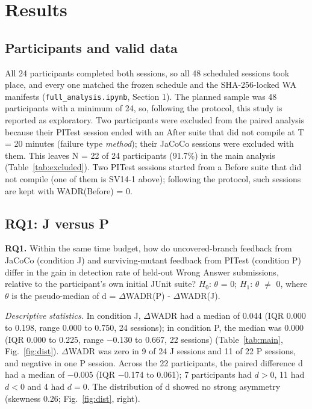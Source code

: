 \section{Results}
\label{sec:results}

\subsection{Participants and valid data}
All 24 participants completed both sessions, so all 48 scheduled sessions took place, and every one matched the frozen schedule and the SHA-256-locked WA manifests (\texttt{full\_analysis.ipynb}, Section 1).
The planned sample was 48 participants with a minimum of 24, so, following the protocol, this study is reported as exploratory.
Two participants were excluded from the paired analysis because their PITest session ended with an After suite that did not compile at T = 20 minutes (failure type \textit{method}); their JaCoCo sessions were excluded with them.
This leaves N = 22 of 24 participants (91.7\%) in the main analysis (Table~\ref{tab:excluded}).
Two PITest sessions started from a Before suite that did not compile (one of them is SV14-1 above); following the protocol, such sessions are kept with WADR(Before) = 0.

\subsection{RQ1: J versus P}
\textbf{RQ1.} Within the same time budget, how do uncovered-branch feedback from JaCoCo (condition J) and surviving-mutant feedback from PITest (condition P) differ in the gain in detection rate of held-out Wrong Answer submissions, relative to the participant's own initial JUnit suite?
$H_0$: $\theta$ = 0; $H_1$: $\theta$ $\neq$ 0, where $\theta$ is the pseudo-median of d = $\Delta$WADR(P) - $\Delta$WADR(J).

\textit{Descriptive statistics.}
In condition J, $\Delta$WADR had a median of 0.044 (IQR 0.000 to 0.198, range 0.000 to 0.750, 24 sessions); in condition P, the median was 0.000 (IQR 0.000 to 0.225, range $-$0.130 to 0.667, 22 sessions) (Table~\ref{tab:main}, Fig.~\ref{fig:dist}).
$\Delta$WADR was zero in 9 of 24 J sessions and 11 of 22 P sessions, and negative in one P session.
Across the 22 participants, the paired difference d had a median of $-$0.005 (IQR $-$0.174 to 0.061); 7 participants had $d > 0$, 11 had $d < 0$ and 4 had $d = 0$.
The distribution of d showed no strong asymmetry (skewness 0.26; Fig.~\ref{fig:dist}, right).

